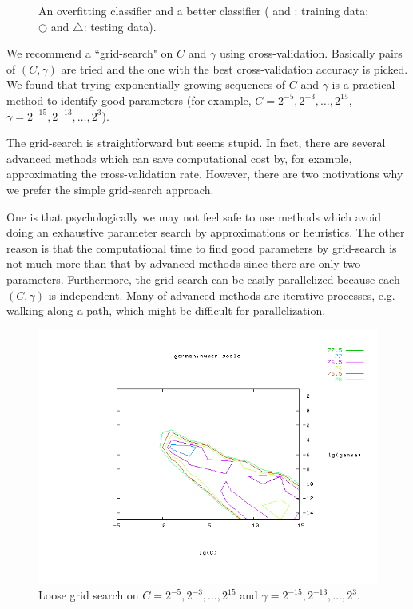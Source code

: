 \documentclass[12pt]{article}
\begin{document}
\begin{figure}[htbp]
\begin{center}
\begin{tabular}{cc}
\end{tabular}
\end{center}
\caption{An overfitting classifier and a better classifier
( and : training data; $\bigcirc$ and $\bigtriangleup$: 
testing data).}
\label{over}
\end{figure}

We recommend a ``grid-search" on $C$ and
$\gamma$ using cross-validation. Basically pairs of $(C,\gamma)$ are tried 
and the one with the best cross-validation accuracy 
is picked. We found that trying
exponentially growing sequences of $C$ and $\gamma$
is a practical method to identify good parameters
(for example, $C=2^{-5},2^{-3},\ldots,2^{15}$, 
$\gamma=2^{-15},2^{-13},\ldots,2^3$).

The grid-search is straightforward but
seems stupid. In fact, there are several 
advanced methods which can save computational 
cost by, for example, approximating the cross-validation 
rate. However, there are two motivations why we prefer the 
simple grid-search approach.

One is that psychologically we may not feel 
safe to use methods which 
avoid doing an exhaustive parameter search 
by approximations or heuristics.
The other reason is that the computational time to find good 
parameters by grid-search is not much more than that 
by advanced methods since there are only 
two parameters.
Furthermore, the grid-search can be easily parallelized 
because each $(C, \gamma)$ is independent.
Many of advanced methods are iterative processes, e.g.
walking along a path, which might be difficult for parallelization. 

\begin{figure}[htbp]
\begin{center}
\includegraphics[width=0.75\linewidth,viewport=145 55 625 450,clip]{coarser.png}
\end{center}
\caption{Loose grid search on $C=2^{-5},2^{-3},\ldots,2^{15}$ and 
$\gamma=2^{-15},2^{-13},\ldots,2^{3}.$}
\label{coarser}
\end{figure}
\end{document}
